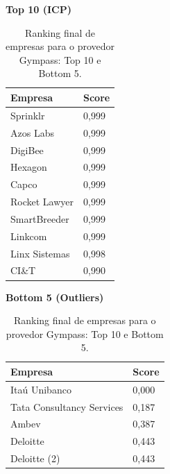 \begin{table}[p]
    \centering
    \caption{Ranking final de empresas para o provedor Gympass: Top 10 e Bottom 5.}
    \label{tab:7_6_ranking_gympass}
    \begin{minipage}{0.48\textwidth}
    \centering
    \textbf{Top 10 (ICP)}\\
    \begin{tabular}{p{5cm}p{1.8cm}}
    \toprule
    Empresa & Score \\
    \midrule
    Sprinklr & 0,999 \\
    Azos Labs & 0,999 \\
    DigiBee & 0,999 \\
    Hexagon & 0,999 \\
    Capco & 0,999 \\
    Rocket Lawyer & 0,999 \\
    SmartBreeder & 0,999 \\
    Linkcom & 0,999 \\
    Linx Sistemas & 0,998 \\
    CI\&T & 0,990 \\
    \bottomrule
    \end{tabular}
    \end{minipage}\hfill
    \begin{minipage}{0.48\textwidth}
    \centering
    \textbf{Bottom 5 (Outliers)}\\
    \begin{tabular}{p{5cm}p{1.8cm}}
    \toprule
    Empresa & Score \\
    \midrule
    Itaú Unibanco & 0,000 \\
    Tata Consultancy Services & 0,187 \\
    Ambev & 0,387 \\
    Deloitte & 0,443 \\
    Deloitte (2) & 0,443 \\
    \bottomrule
    \end{tabular}
    \end{minipage}
\end{table}

